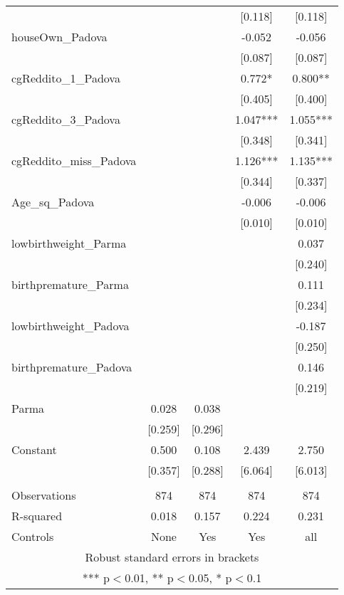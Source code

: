 \documentclass[]{article}
\begin{document}
\begin{tabular}{lcccc}
 &  &  & [0.118] & [0.118] \\
houseOwn\_Padova &  &  & -0.052 & -0.056 \\
 &  &  & [0.087] & [0.087] \\
cgReddito\_1\_Padova &  &  & 0.772* & 0.800** \\
 &  &  & [0.405] & [0.400] \\
cgReddito\_3\_Padova &  &  & 1.047*** & 1.055*** \\
 &  &  & [0.348] & [0.341] \\
cgReddito\_miss\_Padova &  &  & 1.126*** & 1.135*** \\
 &  &  & [0.344] & [0.337] \\
Age\_sq\_Padova &  &  & -0.006 & -0.006 \\
 &  &  & [0.010] & [0.010] \\
lowbirthweight\_Parma &  &  &  & 0.037 \\
 &  &  &  & [0.240] \\
birthpremature\_Parma &  &  &  & 0.111 \\
 &  &  &  & [0.234] \\
lowbirthweight\_Padova &  &  &  & -0.187 \\
 &  &  &  & [0.250] \\
birthpremature\_Padova &  &  &  & 0.146 \\
 &  &  &  & [0.219] \\
Parma & 0.028 & 0.038 &  &  \\
 & [0.259] & [0.296] &  &  \\
Constant & 0.500 & 0.108 & 2.439 & 2.750 \\
 & [0.357] & [0.288] & [6.064] & [6.013] \\
 &  &  &  &  \\
Observations & 874 & 874 & 874 & 874 \\
R-squared & 0.018 & 0.157 & 0.224 & 0.231 \\
 Controls & None & Yes & Yes & all \\ \hline
\multicolumn{5}{c}{ Robust standard errors in brackets} \\
\multicolumn{5}{c}{ *** p$<$0.01, ** p$<$0.05, * p$<$0.1} \\
\end{tabular}
\end{document}
